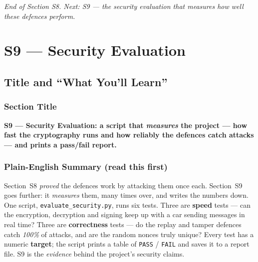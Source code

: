 \documentclass[11pt,a4paper]{report}
\begin{document}
\vfill
\begin{center}\footnotesize\itshape
End of Section S8. Next: S9 --- the security evaluation that measures how well
these defences perform.
\end{center}



\chapter{S9 --- Security Evaluation}

\section{Title and ``What You'll Learn''}

\subsection*{Section Title}
\textbf{S9 --- Security Evaluation: a script that \emph{measures} the project ---
how fast the cryptography runs and how reliably the defences catch attacks ---
and prints a pass/fail report.}

\subsection*{Plain-English Summary (read this first)}
Section~S8 \emph{proved} the defences work by attacking them once each. Section~S9
goes further: it \emph{measures} them, many times over, and writes the numbers
down. One script, \texttt{evaluate\_security.py}, runs six tests. Three are
\textbf{speed} tests --- can the encryption, decryption and signing keep up with
a car sending messages in real time? Three are \textbf{correctness} tests --- do
the replay and tamper defences catch \emph{100\%} of attacks, and are the random
nonces truly unique? Every test has a numeric \textbf{target}; the script prints
a table of \texttt{PASS} / \texttt{FAIL} and saves it to a report file. S9 is the
\emph{evidence} behind the project's security claims.
\end{document}
